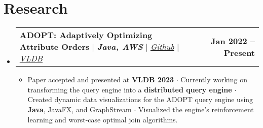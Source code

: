 \documentclass[letterpaper,11pt]{article}
\makeatletter
\newcommand{\resumeItem}[1]{
  \item\small{
    {#1 \vspace{-2pt}}
  }
}
\newcommand{\resumeProjectHeading}[2]{
    \item
    \begin{tabular*}{1.001\textwidth}{l@{\extracolsep{\fill}}r}
      \small#1 & \textbf{\small #2}\\
    \end{tabular*}\vspace{-7pt}
}
\newcommand{\resumeSubHeadingListStart}{\begin{itemize}[leftmargin=0.0in, label={}]}
\newcommand{\resumeSubHeadingListEnd}{\end{itemize}}
\newcommand{\resumeItemListStart}{\begin{itemize}}
\newcommand{\resumeItemListEnd}{\end{itemize}\vspace{-5pt}}
\makeatother
\begin{document}
\section{Research}
  \vspace{-6pt}
      \resumeSubHeadingListStart
      \resumeProjectHeading
      {\textbf{ADOPT: Adaptively Optimizing Attribute Orders} $|$
      \textbf{\emph{Java, AWS}} $|$
      \emph{\href{https://github.com/jxiw/ADOPT}{Github}} $|$
      \emph{\href{https://vldb.org/2023/?papers-demo}{VLDB}}}{Jan 2022 -- Present}
      \resumeItemListStart
              \resumeItem{Paper accepted and presented at \textbf{VLDB 2023} $\cdot$ Currently working
              on transforming the query engine into a \textbf{distributed query engine} $\cdot$ Created dynamic data 
              visualizations for the ADOPT query engine using \textbf{Java}, JavaFX, and GraphStream $\cdot$ Visualized
              the engine's reinforcement learning and worst-case optimal join
              algorithms.}
            \resumeItemListEnd
      \resumeSubHeadingListEnd
  \vspace{-16pt}

\end{document}
